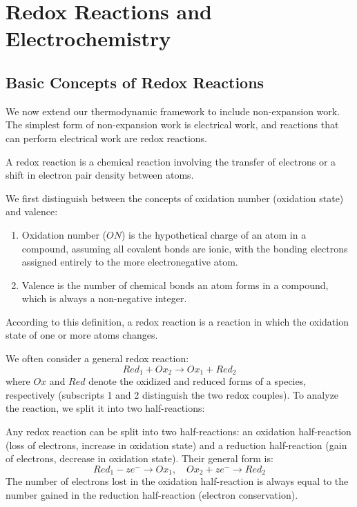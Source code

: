 \section{Redox Reactions and Electrochemistry}  
\subsection{Basic Concepts of Redox Reactions}

We now extend our thermodynamic framework to include non-expansion work. The simplest form of non-expansion work is electrical work, and reactions that can perform electrical work are redox reactions.

\begin{definition}
A redox reaction is a chemical reaction involving the transfer of electrons or a shift in electron pair density between atoms.
\end{definition}

We first distinguish between the concepts of oxidation number (oxidation state) and valence:

\begin{definition}
  \begin{enumerate}
    \item Oxidation number ($ON$) is the hypothetical charge of an atom in a compound, assuming all covalent bonds are ionic, with the bonding electrons assigned entirely to the more electronegative atom.
    \item Valence is the number of chemical bonds an atom forms in a compound, which is always a non-negative integer.
  \end{enumerate}
\end{definition}

According to this definition, a redox reaction is a reaction in which the oxidation state of one or more atoms changes.

We often consider a general redox reaction:
$$Red_1 + Ox_2  \to Ox_1 + Red_2$$
where $Ox$ and $Red$ denote the oxidized and reduced forms of a species, respectively (subscripts 1 and 2 distinguish the two redox couples). To analyze the reaction, we split it into two half-reactions:

\begin{definition}
Any redox reaction can be split into two half-reactions: an oxidation half-reaction (loss of electrons, increase in oxidation state) and a reduction half-reaction (gain of electrons, decrease in oxidation state). Their general form is:
$$Red_1 - ze^- \to Ox_1, \quad Ox_2 + ze^- \to Red_2$$
The number of electrons lost in the oxidation half-reaction is always equal to the number gained in the reduction half-reaction (electron conservation).
\end{definition}

